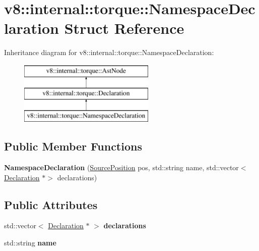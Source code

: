 \hypertarget{structv8_1_1internal_1_1torque_1_1NamespaceDeclaration}{}\section{v8\+:\+:internal\+:\+:torque\+:\+:Namespace\+Declaration Struct Reference}
\label{structv8_1_1internal_1_1torque_1_1NamespaceDeclaration}
Inheritance diagram for v8\+:\+:internal\+:\+:torque\+:\+:Namespace\+Declaration\+:\begin{figure}[H]
\begin{center}
\leavevmode
\includegraphics[height=3.000000cm]{structv8_1_1internal_1_1torque_1_1NamespaceDeclaration}
\end{center}
\end{figure}
\subsection*{Public Member Functions}
\begin{DoxyCompactItemize}
\item 
\mbox{\label{structv8_1_1internal_1_1torque_1_1NamespaceDeclaration_af63cf3e310edd6f8ca75f1c2819deaa5}} 
{\bfseries Namespace\+Declaration} (\mbox{\hyperlink{structv8_1_1internal_1_1torque_1_1SourcePosition}{Source\+Position}} pos, std\+::string name, std\+::vector$<$ \mbox{\hyperlink{structv8_1_1internal_1_1torque_1_1Declaration}{Declaration}} $\ast$$>$ declarations)
\end{DoxyCompactItemize}
\subsection*{Public Attributes}
\begin{DoxyCompactItemize}
\item 
\mbox{\label{structv8_1_1internal_1_1torque_1_1NamespaceDeclaration_ab16882ed12b7394f6e7115e8e2c45131}} 
std\+::vector$<$ \mbox{\hyperlink{structv8_1_1internal_1_1torque_1_1Declaration}{Declaration}} $\ast$ $>$ {\bfseries declarations}
\item 
\mbox{\label{structv8_1_1internal_1_1torque_1_1NamespaceDeclaration_a3cbeba9c9fdfd4dbe882faf5afe5055a}} 
std\+::string {\bfseries name}
\end{DoxyCompactItemize}
